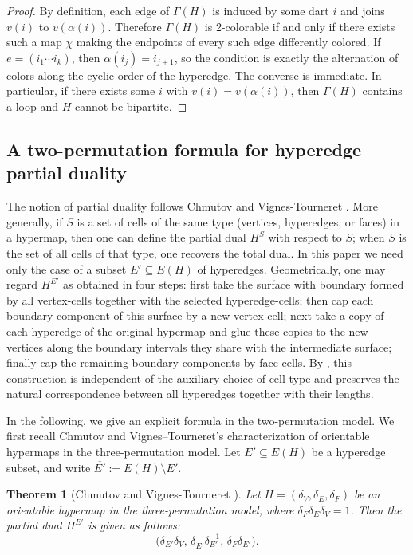 \documentclass{article}
\newtheorem{theorem}{Theorem}[section]
\begin{document}
\begin{proof}
By definition, each edge of $\Gamma(H)$ is induced by some dart $i$ and joins $v(i)$ to $v(\alpha(i))$. Therefore $\Gamma(H)$ is 2-colorable if and only if there exists such a map $\chi$ making the endpoints of every such edge differently colored. If $e=(i_1\cdots i_k)$, then $\alpha(i_j)=i_{j+1}$, so the condition is exactly the alternation of colors along the cyclic order of the hyperedge. The converse is immediate. In particular, if there exists some $i$ with $v(i)=v(\alpha(i))$, then $\Gamma(H)$ contains a loop and $H$ cannot be bipartite.
\end{proof}

\subsection{A two-permutation formula for hyperedge partial duality}

The notion of partial duality follows Chmutov and Vignes-Tourneret \cite[Definition~2.1]{ChmutovVignes2022}. More generally, if $S$ is a set of cells of the same type (vertices, hyperedges, or faces) in a hypermap, then one can define the partial dual $H^S$ with respect to $S$; when $S$ is the set of all cells of that type, one recovers the total dual. In this paper we need only the case of a subset $E'\subseteq E(H)$ of hyperedges. Geometrically, one may regard $H^{E'}$ as obtained in four steps: first take the surface with boundary formed by all vertex-cells together with the selected hyperedge-cells; then cap each boundary component of this surface by a new vertex-cell; next take a copy of each hyperedge of the original hypermap and glue these copies to the new vertices along the boundary intervals they share with the intermediate surface; finally cap the remaining boundary components by face-cells. By \cite[Lemma~2.2 and Lemma~2.3(b)]{ChmutovVignes2022}, this construction is independent of the auxiliary choice of cell type and preserves the natural correspondence between all hyperedges together with their lengths.

In the following, we give an explicit formula in the two-permutation model. We first recall Chmutov and Vignes–Tourneret's characterization of orientable hypermaps in the three-permutation model. Let $E'\subseteq E(H)$ be a hyperedge subset, and write $\overline{E'}:=E(H)\setminus E'$. 

\begin{theorem}[Chmutov and Vignes-Tourneret {\cite{ChmutovVignes2022}}]
\label{thm:CVT-partial-duality}
Let $H=(\delta_V,\delta_E,\delta_F)$ be an orientable hypermap in the three-permutation model, where $\delta_F\delta_E\delta_V=1$. Then the partial dual $H^{E'}$
is given as follows:
\[
        \bigl(
            \delta_{E'}\delta_V,\,
            \delta_{\overline{E'}}\delta_{E'}^{-1},\,
            \delta_F\delta_{E'}
        \bigr).
\]
\end{theorem}
\end{document}
